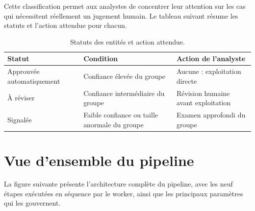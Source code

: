\noindent Cette classification permet aux analystes de concentrer leur attention sur les cas qui nécessitent réellement un jugement humain. Le tableau suivant résume les statuts et l'action attendue pour chacun.

\begin{table}[H]
\centering
\caption{Statuts des entités et action attendue.}
\renewcommand{\arraystretch}{1.3}
\setlength{\tabcolsep}{3pt}
{\small
\begin{tabular}{|p{3.4cm}|p{5.1cm}|p{5.1cm}|}
\hline
\textbf{Statut} & \textbf{Condition} & \textbf{Action de l'analyste} \\
\hline
Approuvée automatiquement & Confiance élevée du groupe & Aucune : exploitation directe \\
\hline
À réviser & Confiance intermédiaire du groupe & Révision humaine avant exploitation \\
\hline
Signalée & Faible confiance ou taille anormale du groupe & Examen approfondi du groupe \\
\hline
\end{tabular}
}
\end{table}

\section{Vue d'ensemble du pipeline}

La figure suivante présente l'architecture complète du pipeline, avec les neuf étapes exécutées en séquence par le worker, ainsi que les principaux paramètres qui les gouvernent.

